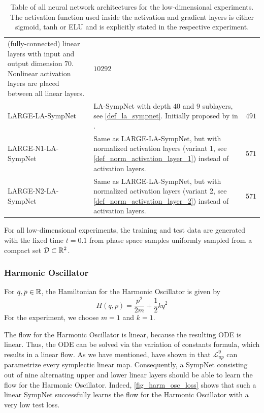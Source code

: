 \documentclass[twoside,a4paper]{article}
\begin{document}
\begin{table}
\begin{tabular}{lp{8cm}c}
		(fully-connected) linear layers with input and output dimension $70$.
		Nonlinear activation layers are placed between all linear layers.
		& $10292$ \\
		LARGE-LA-SympNet & LA-SympNet with depth $40$ and $9$ sublayers, see \cref{def_la_sympnet}.
		Initially proposed by \citeauthor{Jin2020} in \cite{Jin2020}.
		& $491$ \\
		LARGE-N1-LA-SympNet & 
		Same as LARGE-LA-SympNet, but with normalized activation layers (variant 1, 
		see \cref{def_norm_activation_layer_1}) instead of activation layers.
		& $571$ \\
		LARGE-N2-LA-SympNet & 
		Same as LARGE-LA-SympNet, but with normalized activation layers (variant 2, 
		see \cref{def_norm_activation_layer_2}) instead of activation layers.
		& $571$ \\ \bottomrule
	\end{tabular}
	\caption{
	Table of all neural network architectures for the
	low-dimensional experiments. The activation function used inside the activation
	and gradient layers is either sigmoid, tanh or ELU and is explicitly stated
	in the respective experiment.
	}\label{table_low_dim_arch}
\end{table}

For all low-dimensional experiments, the training and test data are generated
with the fixed time $t = 0.1$
from phase space samples uniformly sampled from a compact set $\mathcal{D} \subset \mathbb{R}^2$.

\subsubsection{Harmonic Oscillator}

For $q,p \in \mathbb{R}$, the Hamiltonian for the Harmonic Oscillator is given by
\begin{equation*}
	H(q,p) = \frac{p^2}{2m} + \frac{1}{2} kq^2
\end{equation*}
For the experiment, we choose $m=1$ and $k=1$.

The flow for the Harmonic Oscillator is linear, because the resulting ODE
is linear. Thus, the ODE can be solved via the variation of constants formula,
which results in a linear flow.
As we have mentioned,
\citeauthor{jin2020unit} have shown in \cite{jin2020unit} that $\mathcal{L}^{9}_{up}$
can parametrize every symplectic linear map.
Consequently, a SympNet consisting out of nine alternating 
upper and lower linear layers should be able to learn the flow for the Harmonic Oscillator.
Indeed, \cref{fig_harm_osc_loss} shows that such a linear SympNet successfully 
learns the flow for the Harmonic Oscillator with a very low test loss.
\end{document}
